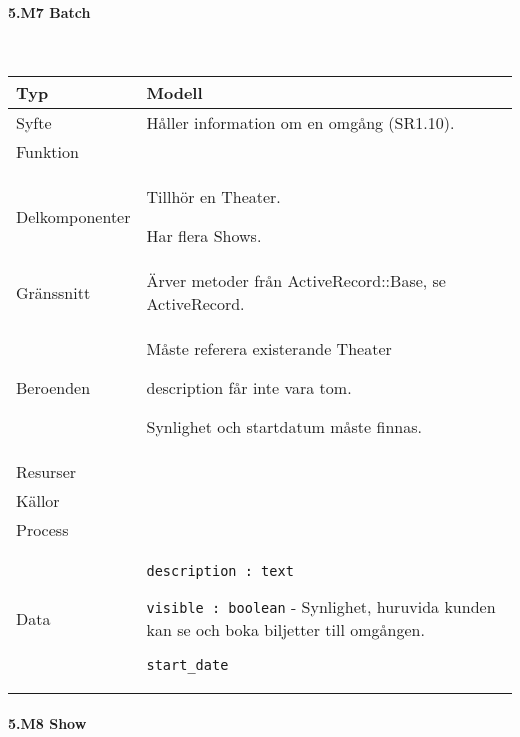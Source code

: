 \documentclass[a4paper, twoside, 11pt, titlepage]{article}
\begin{document}
			\paragraph{5.M7 Batch}\

			\begin {table} [ht] \begin{tabular} {  p{3.5cm} p{9.6cm} }
				\hline
				{Typ} & {Modell} \\
				\hline
				{Syfte} & {Håller information om en omgång (SR1.10).} \\
				\hline
				{Funktion} & { } \\
				\hline
				{Delkomponenter} & {Tillhör en Theater.

Har flera Shows.} \\
				\hline
				{Gränssnitt} & {Ärver metoder från ActiveRecord::Base, se ActiveRecord.} \\
				\hline
				{Beroenden} & {Måste referera existerande Theater

description får inte vara tom.

Synlighet och startdatum måste finnas.} \\
				\hline
				{Resurser} & { } \\
				\hline
				{Källor} & { } \\
				\hline
				{Process} & { } \\
				\hline
				{Data} & {{\tt description : text}

{\tt visible : boolean} - Synlighet, huruvida kunden kan se och boka biljetter till omgången.

{\tt start\_date}} \\
				\hline
			\end{tabular} \end{table} \FloatBarrier


			\paragraph{5.M8 Show}\
\end{document}
